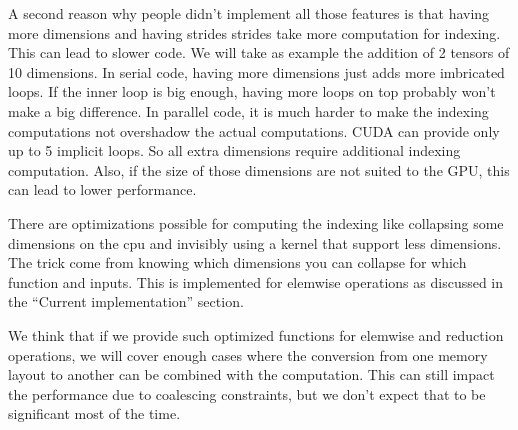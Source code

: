 \documentclass{article} %
\begin{document}
A second reason why people didn't implement all those features is
that having more dimensions and having strides strides take more
computation for indexing. This can lead to slower code. We will take
as example the addition of 2 tensors of 10 dimensions. In serial code,
having more dimensions just adds more imbricated loops. If the inner
loop is big enough, having more loops on top probably won't make a big
difference. In parallel code, it is much harder to make the indexing computations not overshadow the actual computations. CUDA can
provide only up to 5 implicit loops. So all extra dimensions require
additional indexing computation. Also, if the size of those dimensions
are not suited to the GPU, this can lead to lower performance.

There are optimizations possible for computing the indexing like
collapsing some dimensions on the cpu and invisibly using a kernel
that support less dimensions. The trick come from knowing which 
dimensions you can collapse for which function and inputs. This is
implemented for elemwise operations as discussed in the ``Current
implementation'' section.

We think that if we provide such optimized functions for elemwise and
reduction operations, we will cover enough cases where the conversion from
one memory layout to another can be combined with the computation. This
can still impact the performance due to coalescing constraints, but we
don't expect that to be significant most of the time.

\end{document}
